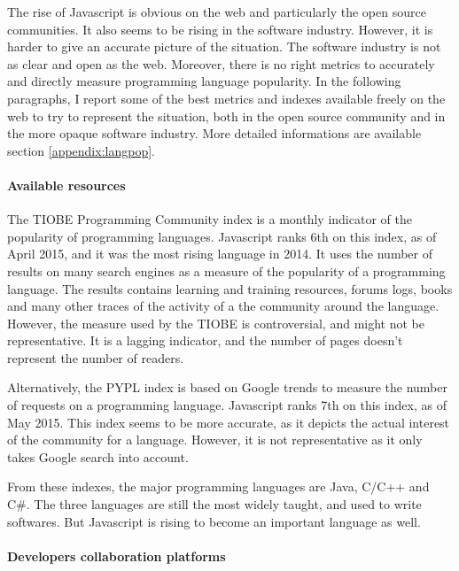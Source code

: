 The rise of Javascript is obvious on the web and particularly the open source communities.
It also seems to be rising in the software industry.
However, it is harder to give an accurate picture of the situation.
The software industry is not as clear and open as the web.
Moreover, there is no right metrics to accurately and directly measure programming language popularity.
In the following paragraphs, I report some of the best metrics and indexes available freely on the web to try to represent the situation, both in the open source community and in the more opaque software industry.
More detailed informations are available section \ref{appendix:langpop}.

\paragraph{Available resources}

The TIOBE Programming Community index is a monthly indicator of the popularity of programming languages.
Javascript ranks 6th on this index, as of April 2015, and it was the most rising language in 2014.
It uses the number of results on many search engines as a measure of the popularity of a programming language.
The results contains learning and training resources, forums logs, books and many other traces of the activity of a the community around the language.
However, the measure used by the TIOBE is controversial, and might not be representative.
It is a lagging indicator, and the number of pages doesn't represent the number of readers.

Alternatively, the PYPL index is based on Google trends to measure the number of requests on a programming language.
Javascript ranks 7th on this index, as of May 2015.
This index seems to be more accurate, as it depicts the actual interest of the community for a language.
However, it is not representative as it only takes Google search into account.

From these indexes, the major programming languages are Java, C/C++ and C\#.
The three languages are still the most widely taught, and used to write softwares.
But Javascript is rising to become an important language as well.

\paragraph{Developers collaboration platforms}

